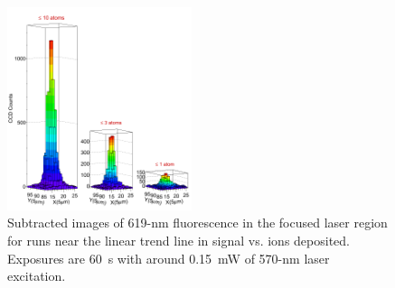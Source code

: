 \documentclass[aps,pra,reprint,superscriptaddress]{revtex4-1}
\begin{document}



\begin{figure}
\includegraphics[width=0.48\textwidth]{figures/lego_train_fromthesis.png}
\caption{Subtracted images of 619-nm fluorescence in the focused laser region for runs near the linear trend line in signal vs. ions deposited.  Exposures are 60~s with around 0.15~mW of 570-nm laser excitation.}
\label{fig:train}
\end{figure}
\end{document}
